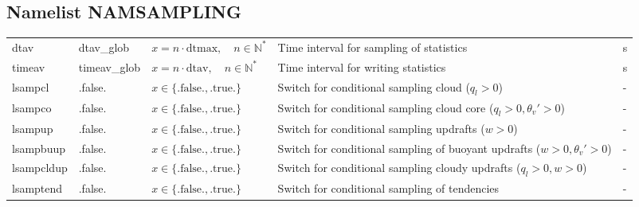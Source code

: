 \documentclass[twoside,11pt,fleqn,a4paper,english,openright]{report}
\begin{document}
\subsection{Namelist NAMSAMPLING}\label{par:sampling}
\begin{center}
  \tablelasttail{
        &&&&\\\hline
  }
\begin{supertabular}{|l|p{2cm}|p{4cm}|p{6cm}|l|}
  dtav		& dtav\_glob	& $x = n \cdot \text{dtmax}, \quad n \in \mathbb{N}^*$	& Time interval for sampling of statistics	& s\\
  timeav	& timeav\_glob	& $x = n \cdot \text{dtav}, \quad n \in \mathbb{N}^*$	& Time interval for writing statistics	& s\\
  lsampcl	& .false.	& $x\in\{\text{.false.},\text{.true.}\}$	& Switch for conditional sampling cloud ($q_l > 0$)	& -\\
  lsampco	& .false.	& $x\in\{\text{.false.},\text{.true.}\}$	& Switch for conditional sampling cloud core ($q_l > 0,\theta_v' > 0$)	& -\\
  lsampup	& .false.	& $x\in\{\text{.false.},\text{.true.}\}$	& Switch for conditional sampling updrafts ($w > 0$)	& -\\
  lsampbuup	& .false.	& $x\in\{\text{.false.},\text{.true.}\}$	& Switch for conditional sampling of buoyant updrafts ($w > 0, \theta_v' > 0$)	& -\\
  lsampcldup & .false.       & $x\in\{\text{.false.},\text{.true.}\}$        & Switch for conditional sampling cloudy updrafts ($q_l > 0, w > 0$) & -\\
  lsamptend & .false.        & $x\in\{\text{.false.},\text{.true.}\}$        & Switch for conditional sampling of tendencies & -\\
\end{supertabular}
\end{center}
\end{document}
